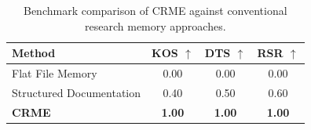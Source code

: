 \begin{table}[t]
\caption{Benchmark comparison of CRME against conventional research memory approaches.}
\label{tab:benchmark}
\centering
\begin{tabular}{lccc}
\hline
\textbf{Method} &
\textbf{KOS} $\uparrow$ &
\textbf{DTS} $\uparrow$ &
\textbf{RSR} $\uparrow$ \\
\hline

Flat File Memory & 0.00 & 0.00 & 0.00 \\

Structured Documentation & 0.40 & 0.50 & 0.60 \\

\textbf{CRME} &
\textbf{1.00} &
\textbf{1.00} &
\textbf{1.00} \\

\hline
\end{tabular}
\end{table}

